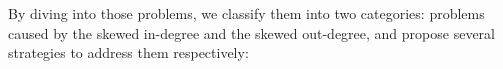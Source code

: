 \documentclass[conference]{IEEEtran}
\begin{document}
By diving into those problems, we classify them into two categories: problems caused by the skewed in-degree and the skewed out-degree, and propose several strategies to address them respectively:
 


\end{document}
